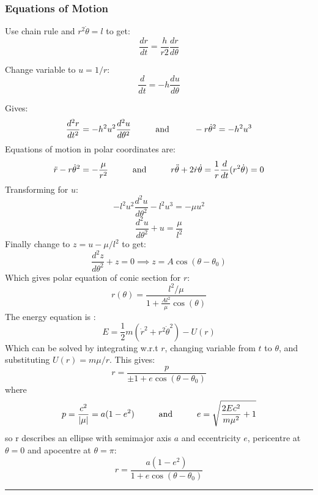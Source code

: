 \documentclass[table,cmyk]{article}
\begin{document}
\begin{longtable}
\subsubsection*{Equations of Motion}
Use chain rule and $r^2\dot{\theta} = l$ to get:
\[\frac{dr}{dt} = \frac{h}{r2}\frac{dr}{d\theta}\]

Change variable to $u = 1/r$:
\[\frac{d}{dt} = -h \frac{du}{d\theta}\]

Gives:
\[\frac{d^2r}{dt^2} = -h^2u^2\frac{d^2u}{d\theta^2}\text{\hspace{1cm}and\hspace{1cm}} -r\dot{\theta}^2 = -h^2u^3\]
Equations of motion in polar coordinates are:
\[\ddot{r} - r\dot{\theta}^2 = -\frac{\mu}{r^2}\text{\hspace{1cm}and\hspace{1cm}}r\ddot{\theta}+2\dot{r}\dot{\theta} = \frac{1}{r}\frac{d}{dt}(r^2\dot{\theta})=0\]
Transforming for $u$:
\[-l^2u^2\frac{d^2u}{d\theta^2}-l^2u^3 = -\mu u^2\]
\[\frac{d^2u}{d\theta^2}+u = \frac{\mu}{l^2}\]
Finally change to $z = u-\mu/l^2$ to get:
\[\frac{d^2z}{d\theta^2}+z = 0 \implies z = A\cos(\theta-\theta_0)\]
Which gives polar equation of conic section for $r$:
\[r(\theta) = \frac{l^2/\mu}{1+\frac{Al^2}{\mu}\cos(\theta)}\]
The energy equation is :
\[E = \frac{1}{2}m(\dot{r}^2+r^2\dot{\theta}^2)-U(r)\]
Which can be solved by integrating w.r.t $r$, changing variable from $t$ to $\theta$, and substituting $U(r) = m\mu/r$. This gives:
\[r = \frac{p}{\pm1+e\cos(\theta-\theta_0)}\]
where
\[p = \frac{c^2}{|\mu|}=a(1-e^2)\text{\hspace{1cm}and\hspace{1cm}}e = \sqrt{\frac{2Ec^2}{m\mu^2}+1}\]
so r describes an ellipse with semimajor axis $a$ and eccentricity $e$, pericentre at $\theta=0$ and apocentre at $\theta=\pi$:
\[r = \frac{a(1-e^2)}{1+e\cos(\theta-\theta_0)}\]



\vspace{2cm}

\noindent\rule{9cm}{0.4pt}
\tabularnewline\hline

\end{longtable}
\end{document}

